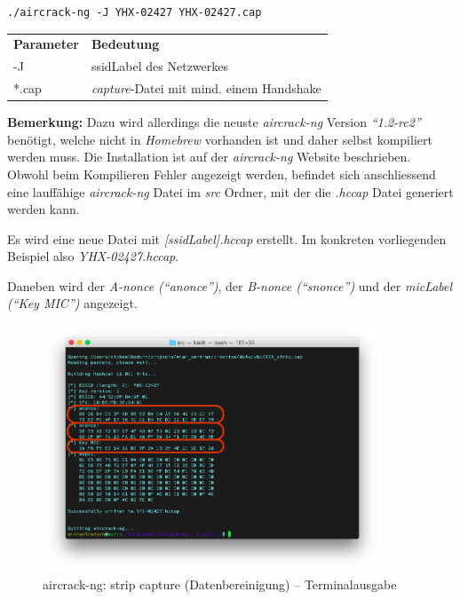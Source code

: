 \begin{lstlisting}[style=lstStyleFramed]
./aircrack-ng -J YHX-02427 YHX-02427.cap
\end{lstlisting}
\begin{tabular}{l l}
	\textbf{Parameter} & \textbf{Bedeutung}\\
	-J & \gls{ssidLabel} des Netzwerkes\\
	*.cap & \textit{capture}-Datei mit mind. einem Handshake\\
\end{tabular}

\begin{framed}
	\textbf{Bemerkung:} Dazu wird allerdings die neuste \textit{aircrack-ng} Version \textit{"`1.2-rc2"'} benötigt, welche nicht in \textit{Homebrew} vorhanden ist und daher selbst kompiliert werden muss. Die Installation ist auf der \textit{aircrack-ng} Website beschrieben.\\
	Obwohl beim Kompilieren Fehler angezeigt werden, befindet sich anschliessend eine lauffähige \textit{aircrack-ng} Datei im \textit{src} Ordner, mit der die \textit{.hccap} Datei generiert werden kann.
\end{framed}

Es wird eine neue Datei mit \textit{[\gls{ssidLabel}].hccap} erstellt. Im konkreten vorliegenden Beispiel also \textit{YHX-02427.hccap}.

Daneben wird der \textit{A-nonce ("`anonce"')}, der \textit{B-nonce ("`snonce"')} und der \textit{\gls{micLabel} ("`Key MIC"')} angezeigt.
\begin{figure}[H]
	\centering
	\includegraphics[width=0.9\textwidth]{images/wpa/conversion_cap2hccap.png}
	\caption{aircrack-ng: strip capture (Datenbereinigung) -- Terminalausgabe}
\end{figure}

